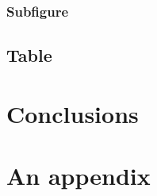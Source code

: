 \documentclass[12pt,a4paper,twoside]{report}
\begin{document}
            \FloatBarrier

            \subsubsection{Subfigure}
                \label{sec:subfig}
                

       \clearpage

        \subsection{Table}
            \label{sec:tbl}
            

    \cleardoublepage

    \section{Conclusions}
        \label{sec:outro}
        

    \nocite{*}  %
    
    

    \appendixpage
    \addappheadtotoc

    \appendix
      \section{An appendix}
        \label{sec:app}
        
\end{document}
